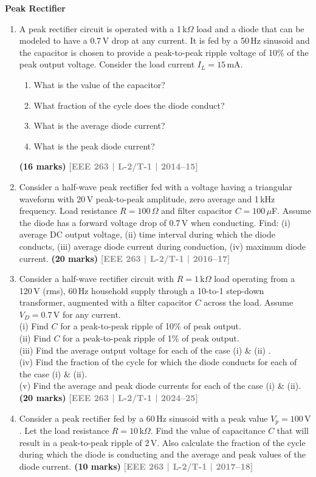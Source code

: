 \documentclass[12pt,a4paper]{article}
\newcommand{\yr}[1]{\hfill\textcolor{gray}{\small\textbf{[#1]}}}
\newcommand{\mk}[1]{\textcolor{orange!70!black}{\small\textbf{(#1 marks)}}}
\newcommand{\subtopic}[2]{%
  \vspace{10pt}
  \noindent\begin{tcolorbox}[colback=#1!8,colframe=#1,boxrule=0.6pt,arc=4pt,
    left=6pt,right=6pt,top=4pt,bottom=4pt]
    \small\bfseries\textcolor{#1}{#2}
  \end{tcolorbox}
  \vspace{2pt}
}
\begin{document}
\subtopic{cA}{Peak Rectifier}
\label{sub:s1-peak}

\begin{enumerate}

\item A peak rectifier circuit is operated with a 1\,k$\Omega$ load and a diode that can be modeled to have a 0.7\,V drop at any current. It is fed by a 50\,Hz sinusoid and the capacitor is chosen to provide a peak-to-peak ripple voltage of 10\% of the peak output voltage. Consider the load current $I_L = 15\,\text{mA}$.
\begin{enumerate}
  \item What is the value of the capacitor?
  \item What fraction of the cycle does the diode conduct?
  \item What is the average diode current?
  \item What is the peak diode current?
\end{enumerate}
\mk{16} \yr{EEE 263 | L-2/T-1 | 2014--15}

\item Consider a half-wave peak rectifier fed with a voltage having a triangular waveform with 20\,V peak-to-peak amplitude, zero average and 1\,kHz frequency. Load resistance $R=100\,\Omega$ and filter capacitor $C=100\,\mu$F. Assume the diode has a forward voltage drop of 0.7\,V when conducting. Find: (i) average DC output voltage, (ii) time interval during which the diode conducts, (iii) average diode current during conduction, (iv) maximum diode current.
\mk{20} \yr{EEE 263 | L-2/T-1 | 2016--17}

\item Consider a half-wave rectifier circuit with $R=1\,\text{k}\Omega$ load operating from a 120\,V (rms), 60\,Hz household supply through a 10-to-1 step-down transformer, augmented with a filter capacitor $C$ across the load. Assume $V_D=0.7\,\text{V}$ for any current. \\
(i) Find $C$ for a peak-to-peak ripple of 10\% of peak output.\\
 (ii) Find $C$ for a peak-to-peak ripple of 1\% of peak output. \\
 (iii) Find the average output voltage for each of the case (i) \& (ii) . \\
 (iv) Find the fraction of the cycle for which the diode conducts for each of the case (i) \& (ii).\\
 (v) Find the average and peak diode currents for each of the case (i) \& (ii).\\
\mk{20} \yr{EEE 263 | L-2/T-1 | 2024--25}

\item Consider a peak rectifier fed by a 60\,Hz sinusoid with a peak value $V_p=100\,\text{V}$. Let the load resistance $R=10\,\text{k}\Omega$. Find the value of capacitance $C$ that will result in a peak-to-peak ripple of 2\,V. Also calculate the fraction of the cycle during which the diode is conducting and the average and peak values of the diode current.
\mk{10} \yr{EEE 263 | L-2/T-1 | 2017--18}

\end{enumerate}
\end{document}
